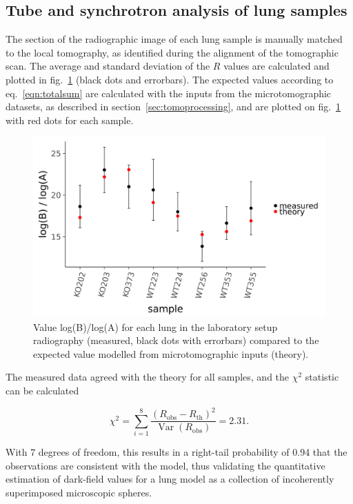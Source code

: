 \documentclass[preprint,12pt]{elsarticle}
\begin{document}
\subsection*{Tube and synchrotron analysis of lung samples}
The section of the radiographic image of each lung sample is manually
matched to the local tomography, as identified during the alignment of the
tomographic scan. The average and standard deviation of the $R$ values are
calculated and plotted in fig.~\ref{206272} (black dots and errorbars). The expected
values according to eq.~\ref{eqn:totalsum} are calculated with the inputs from the
microtomographic datasets, as described in section~\ref{sec:tomoprocessing}, and are plotted on
fig.~\ref{206272} with red dots for each sample.
\begin{figure}[h!]
\begin{center}
\includegraphics[width=0.70\columnwidth]{figures/samples/samples}
\caption{{Value log(B)/log(A) for each lung in the laboratory setup radiography
(measured, black dots with errorbars) compared to the expected value
modelled from microtomographic inputs (theory).
{\label{206272}}%
}}
\end{center}
\end{figure}


The measured data agreed with the
theory for all samples, and the $\chi^2$ statistic can be calculated

\begin{equation}
    \chi^2 = \sum_{i=1}^8 \dfrac{(R_{\text{obs}} -
    R_{\text{th}})^2}{\mathop{\mathrm{Var}}(R_{\text{obs}})} = 2.31.
    \label{eqn:chisq}
\end{equation}

With 7 degrees of freedom, this results in a right-tail probability of 0.94 that the 
observations are consistent with the model, thus validating the quantitative estimation of
dark-field values for a lung model as a collection of incoherently
superimposed microscopic spheres.
\end{document}
